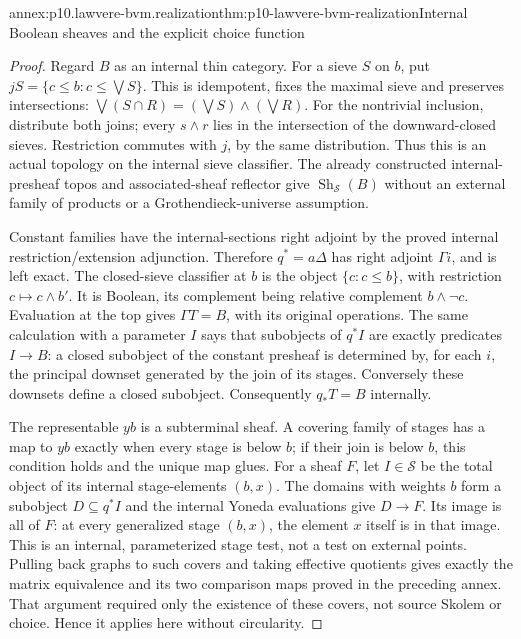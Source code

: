 \begin{annexitem}{annex:p10.lawvere-bvm.realization}{thm:p10-lawvere-bvm-realization}{Internal Boolean sheaves and the explicit choice function}
\begin{proof}
Regard \(B\) as an internal thin category. For a sieve \(S\)
on \(b\), put \(jS=\{c\le b:c\le\bigvee S\}\). This is
idempotent, fixes the maximal sieve and preserves intersections:
\(\bigvee(S\cap R)=(\bigvee S)\wedge(\bigvee R)\).
For the nontrivial inclusion, distribute both joins; every
\(s\wedge r\) lies in the intersection of the downward-closed
sieves. Restriction commutes with \(j\), by the same distribution.
Thus this is an actual topology on the internal sieve classifier.
The already constructed internal-presheaf topos and associated-sheaf
reflector give \(\operatorname{Sh}_{\mathcal S}(B)\) without an
external family of products or a Grothendieck-universe assumption.

Constant families have the internal-sections right adjoint by the
proved internal restriction/extension adjunction. Therefore
\(q^*=a\Delta\) has right adjoint \(\Gamma i\), and is left
exact. The closed-sieve classifier at \(b\) is the object
\(\{c:c\le b\}\), with restriction \(c\mapsto c\wedge b'\).
It is Boolean, its complement being relative complement
\(b\wedge\neg c\). Evaluation at the top gives
\(\Gamma T=B\), with its original operations. The same calculation
with a parameter \(I\) says that subobjects of \(q^*I\) are
exactly predicates \(I\to B\): a closed subobject of the constant
presheaf is determined by, for each \(i\), the principal downset
generated by the join of its stages. Conversely these downsets define
a closed subobject. Consequently \(q_*T=B\) internally.

The representable \(y b\) is a subterminal sheaf. A covering family
of stages has a map to \(y b\) exactly when every stage is below
\(b\); if their join is below \(b\), this condition holds and
the unique map glues. For a sheaf \(F\), let \(I\in\mathcal S\)
be the total object of its internal stage-elements \((b,x)\).
The domains with weights \(b\) form a subobject \(D\subseteq q^*I\)
and the internal Yoneda evaluations give \(D\to F\). Its image is
all of \(F\): at every generalized stage \((b,x)\), the element
\(x\) itself is in that image. This is an internal, parameterized
stage test, not a test on external points. Pulling back graphs to
such covers and taking effective quotients gives exactly the matrix
equivalence and its two comparison maps proved in the preceding annex.
That argument required only the existence of these covers, not source
Skolem or choice. Hence it applies here without circularity.


\end{proof}
\end{annexitem}
